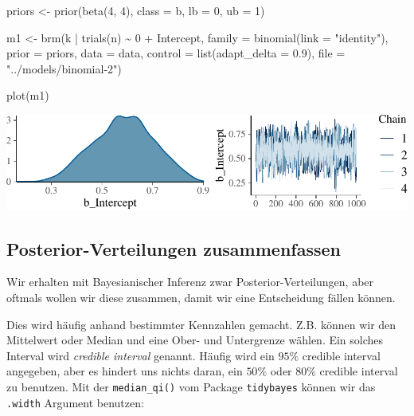 \documentclass[]{tufte-handout}
\newenvironment{Shaded}{}{}
\newcommand{\AttributeTok}[1]{\textcolor[rgb]{0.49,0.56,0.16}{#1}}
\newcommand{\DecValTok}[1]{\textcolor[rgb]{0.25,0.63,0.44}{#1}}
\newcommand{\FloatTok}[1]{\textcolor[rgb]{0.25,0.63,0.44}{#1}}
\newcommand{\FunctionTok}[1]{\textcolor[rgb]{0.02,0.16,0.49}{#1}}
\newcommand{\NormalTok}[1]{#1}
\newcommand{\OtherTok}[1]{\textcolor[rgb]{0.00,0.44,0.13}{#1}}
\newcommand{\SpecialCharTok}[1]{\textcolor[rgb]{0.25,0.44,0.63}{#1}}
\newcommand{\StringTok}[1]{\textcolor[rgb]{0.25,0.44,0.63}{#1}}
\begin{document}
\begin{Shaded}
\begin{Highlighting}[]
\NormalTok{priors }\OtherTok{\textless{}{-}} \FunctionTok{prior}\NormalTok{(}\FunctionTok{beta}\NormalTok{(}\DecValTok{4}\NormalTok{, }\DecValTok{4}\NormalTok{), }\AttributeTok{class =}\NormalTok{ b, }\AttributeTok{lb =} \DecValTok{0}\NormalTok{, }\AttributeTok{ub =} \DecValTok{1}\NormalTok{)}

\NormalTok{m1 }\OtherTok{\textless{}{-}} \FunctionTok{brm}\NormalTok{(k }\SpecialCharTok{|} \FunctionTok{trials}\NormalTok{(n) }\SpecialCharTok{\textasciitilde{}} \DecValTok{0} \SpecialCharTok{+}\NormalTok{ Intercept, }\AttributeTok{family =} \FunctionTok{binomial}\NormalTok{(}\AttributeTok{link =} \StringTok{"identity"}\NormalTok{),}
          \AttributeTok{prior =}\NormalTok{ priors,}
          \AttributeTok{data =}\NormalTok{ data,}
          \AttributeTok{control =} \FunctionTok{list}\NormalTok{(}\AttributeTok{adapt\_delta =} \FloatTok{0.9}\NormalTok{),}
          \AttributeTok{file =} \StringTok{"../models/binomial{-}2"}\NormalTok{)}
\end{Highlighting}
\end{Shaded}

\begin{Shaded}
\begin{Highlighting}[]
\FunctionTok{plot}\NormalTok{(m1)}
\end{Highlighting}
\end{Shaded}

\includegraphics{01-intro-bayesian-stats_files/figure-latex/unnamed-chunk-34-1}

\hypertarget{posterior-verteilungen-zusammenfassen}{%
\subsection{Posterior-Verteilungen
zusammenfassen}\label{posterior-verteilungen-zusammenfassen}}

Wir erhalten mit Bayesianischer Inferenz zwar Posterior-Verteilungen,
aber oftmals wollen wir diese zusammen, damit wir eine Entscheidung
fällen können.

Dies wird häufig anhand bestimmter Kennzahlen gemacht. Z.B. können wir
den Mittelwert oder Median und eine Ober- und Untergrenze wählen. Ein
solches Interval wird \emph{credible interval} genannt. Häufig wird ein
\(95\%\) credible interval angegeben, aber es hindert uns nichts daran,
ein \(50\%\) oder \(80\%\) credible interval zu benutzen. Mit der
\texttt{median\_qi()} vom Package \texttt{tidybayes} können wir das
\texttt{.width} Argument benutzen:
\end{document}
